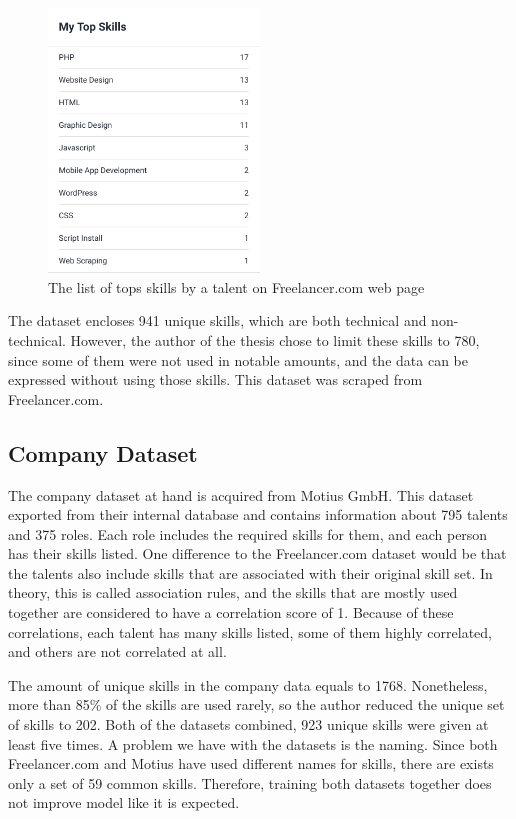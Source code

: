 \begin{figure}[htp]
	\centering
	\includegraphics[width=0.5\textwidth]{figures/FreelancerTalentSkills.png}
	\caption{The list of tops skills by a talent on Freelancer.com web page}
	\label{fig:freelancer-talent-talent}
\end{figure}


The dataset encloses  941 unique skills, which are both technical and non-technical. However, the author of the thesis chose to limit these skills to 780, since some of them were not used in notable amounts, and the data can be expressed without using those skills. This dataset was scraped from Freelancer.com.


\subsection{Company Dataset}\label{subsection:company-dataset}

The company dataset at hand is acquired from Motius GmbH. This dataset exported from their internal database and contains information about 795 talents and 375 roles. Each role includes the required skills for them, and each person has their skills listed. One difference to the Freelancer.com dataset would be that the talents also include skills that are associated with their original skill set. In theory, this is called association rules, and the skills that are mostly used together are considered to have a correlation score of 1. Because of these correlations, each talent has many skills listed, some of them highly correlated, and others are not correlated at all.


The amount of unique skills in the company data equals to 1768. Nonetheless, more than 85\% of the skills are used rarely, so the author reduced the unique set of skills to  202. Both of the datasets combined, 923 unique skills were given at least five times. A problem we have with the datasets is the naming. Since both Freelancer.com and Motius have used different names for skills, there are exists only a set of 59 common skills. Therefore, training both datasets together does not improve model like it is expected.



